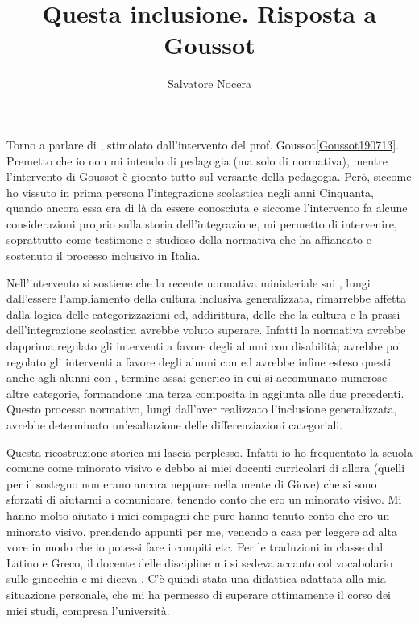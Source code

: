 \author{Salvatore Nocera}
\title{Questa inclusione. Risposta a Goussot}
\label{cha:nocera300713}
\maketitle
Torno a parlare di , stimolato dall'intervento del prof. Goussot\ref{Goussot190713}. Premetto che io non mi intendo di pedagogia (ma solo di normativa), mentre l'intervento di Goussot è giocato tutto sul versante della pedagogia. Però, siccome ho vissuto in prima persona l'integrazione scolastica negli anni Cinquanta, quando ancora essa era di là da essere conosciuta e siccome l'intervento fa alcune considerazioni proprio sulla storia dell'integrazione, mi permetto di intervenire, soprattutto come testimone e studioso della normativa che ha affiancato e sostenuto il processo inclusivo in Italia.

Nell'intervento si sostiene che la recente normativa ministeriale sui , lungi dall'essere l'ampliamento della cultura inclusiva generalizzata, rimarrebbe affetta dalla logica delle categorizzazioni ed, addirittura, delle  che la cultura e la prassi dell'integrazione scolastica avrebbe voluto superare. Infatti la normativa avrebbe dapprima regolato gli interventi a favore degli alunni con disabilità; avrebbe poi regolato gli interventi a favore degli alunni con  ed avrebbe infine esteso questi anche agli alunni con , termine assai generico in cui si accomunano numerose altre categorie, formandone una terza composita in aggiunta alle due precedenti. Questo processo normativo, lungi dall'aver realizzato l'inclusione generalizzata, avrebbe determinato un'esaltazione delle differenziazioni categoriali.

Questa ricostruzione storica mi lascia perplesso. Infatti io ho frequentato la scuola comune come minorato visivo e debbo ai miei docenti curricolari di allora (quelli per il sostegno non erano ancora neppure nella mente di Giove) che si sono sforzati di aiutarmi a comunicare, tenendo conto che ero un minorato visivo. Mi hanno molto aiutato i miei compagni che pure hanno tenuto conto che ero un minorato visivo, prendendo appunti per me, venendo a casa per leggere ad alta voce in modo che io potessi fare i compiti etc. Per le traduzioni in classe dal Latino e Greco, il docente delle discipline mi si sedeva accanto col vocabolario sulle ginocchia e mi diceva . C'è quindi stata una didattica adattata alla mia situazione personale, che mi ha permesso di superare ottimamente il corso dei miei studi, compresa l'università.

